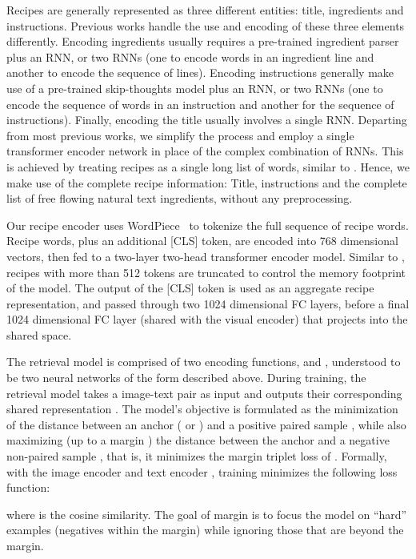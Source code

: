 \documentclass[sigconf,nonacm]{acmart}
\begin{document}
Recipes are generally represented as three different entities: title, ingredients and instructions. Previous works handle the use and encoding of these three elements differently. Encoding ingredients usually requires a pre-trained ingredient parser plus an RNN, or two RNNs (one to encode words in an ingredient line and another to encode the sequence of lines). Encoding instructions generally make use of a pre-trained skip-thoughts model plus an RNN, or two RNNs (one to encode the sequence of words in an instruction and another for the sequence of instructions). Finally, encoding the title usually involves a single RNN. Departing from most previous works, we simplify the process and employ a single transformer encoder network \cite{Vaswani2017} in place of the complex combination of RNNs. This is achieved by treating recipes as a single long list of words, similar to \cite{Fain2019}. Hence, we make use of the complete recipe information: Title, instructions and the complete list of free flowing natural text ingredients, without any preprocessing. 

Our recipe encoder  
uses
WordPiece~\cite{Wu2016} to tokenize the full sequence of recipe words. Recipe words, plus an additional [CLS] token, are encoded into 768 dimensional vectors, then fed to a two-layer two-head transformer encoder model. Similar to \cite{Devlin2018}, recipes with more than 512 tokens are truncated to control the memory footprint of the model. The output of the [CLS] token is used as an aggregate recipe representation, and passed through two 1024 dimensional FC layers, before a final 1024 dimensional FC layer (shared with the visual encoder) that projects into the shared space.


The retrieval model is comprised of two encoding functions,  and , understood to be two neural networks of the form described above. During training, the retrieval model takes a
image-text pair  as input and outputs their corresponding shared representation . The model's objective is formulated as the minimization of the distance between an anchor  ( or ) and a positive paired sample , while also maximizing (up to a margin ) the distance between the anchor  and a negative non-paired sample , that is, it minimizes the margin triplet loss of . Formally, with the image encoder  and text encoder , 
training minimizes the following loss function:


\noindent where  is the cosine similarity.
The goal of margin  is to focus the model on ``hard'' examples (negatives within the margin) while ignoring those that are beyond the margin. 
\end{document}
